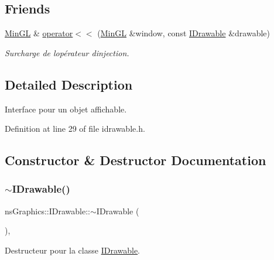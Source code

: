 \subsection*{Friends}
\begin{DoxyCompactItemize}
\item 
\hyperlink{class_min_g_l}{Min\+GL} \& \hyperlink{classns_graphics_1_1_i_drawable_a9bb3952d4e675a663f2dbbda11e79395}{operator$<$$<$} (\hyperlink{class_min_g_l}{Min\+GL} \&window, const \hyperlink{classns_graphics_1_1_i_drawable}{I\+Drawable} \&drawable)
\begin{DoxyCompactList}\small\item\em Surcharge de l\textquotesingle{}opérateur d\textquotesingle{}injection. \end{DoxyCompactList}\end{DoxyCompactItemize}


\subsection{Detailed Description}
Interface pour un objet affichable. 

Definition at line 29 of file idrawable.\+h.



\subsection{Constructor \& Destructor Documentation}
\mbox{\label{classns_graphics_1_1_i_drawable_ab7a2ae7682163969bd4627e402ef0867}} 
\subsubsection{\texorpdfstring{$\sim$\+I\+Drawable()}{~IDrawable()}}
{\footnotesize\ttfamily ns\+Graphics\+::\+I\+Drawable\+::$\sim$\+I\+Drawable (\begin{DoxyParamCaption}{ }\end{DoxyParamCaption})\hspace{0.3cm}{\ttfamily [virtual]}, {\ttfamily [default]}}



Destructeur pour la classe \hyperlink{classns_graphics_1_1_i_drawable}{I\+Drawable}. 



